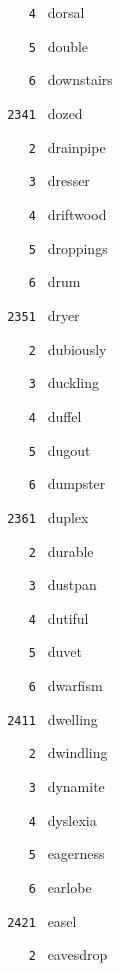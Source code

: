 \documentclass[11pt]{article}
\begin{document}
\begin{multicols}{6}
\noindent \texttt{ \ \ \ 4 } dorsal  \par
\noindent \texttt{ \ \ \ 5 } double  \par
\noindent \texttt{ \ \ \ 6 } downstairs  \par
\vspace{3mm}
\noindent \texttt{ 2341 } dozed  \par
\noindent \texttt{ \ \ \ 2 } drainpipe  \par
\noindent \texttt{ \ \ \ 3 } dresser  \par
\noindent \texttt{ \ \ \ 4 } driftwood  \par
\noindent \texttt{ \ \ \ 5 } droppings  \par
\noindent \texttt{ \ \ \ 6 } drum  \par
\vspace{3mm}
\noindent \texttt{ 2351 } dryer  \par
\noindent \texttt{ \ \ \ 2 } dubiously  \par
\noindent \texttt{ \ \ \ 3 } duckling  \par
\noindent \texttt{ \ \ \ 4 } duffel  \par
\noindent \texttt{ \ \ \ 5 } dugout  \par
\noindent \texttt{ \ \ \ 6 } dumpster  \par
\vspace{3mm}
\noindent \texttt{ 2361 } duplex  \par
\noindent \texttt{ \ \ \ 2 } durable  \par
\noindent \texttt{ \ \ \ 3 } dustpan  \par
\noindent \texttt{ \ \ \ 4 } dutiful  \par
\noindent \texttt{ \ \ \ 5 } duvet  \par
\noindent \texttt{ \ \ \ 6 } dwarfism  \par
\noindent \texttt{ 2411 } dwelling  \par
\noindent \texttt{ \ \ \ 2 } dwindling  \par
\noindent \texttt{ \ \ \ 3 } dynamite  \par
\noindent \texttt{ \ \ \ 4 } dyslexia  \par
\noindent \texttt{ \ \ \ 5 } eagerness  \par
\noindent \texttt{ \ \ \ 6 } earlobe  \par
\vspace{3mm}
\noindent \texttt{ 2421 } easel  \par
\noindent \texttt{ \ \ \ 2 } eavesdrop  \par

\end{multicols}
\end{document}
